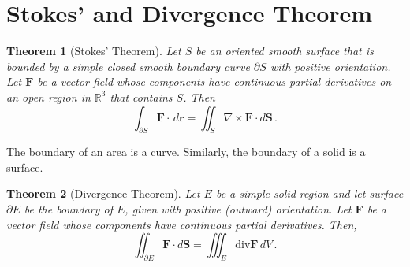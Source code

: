 \documentclass[
]{book}
\newtheorem{theorem}{Theorem}[chapter]
\theoremstyle{definition}
\theoremstyle{definition}
\theoremstyle{definition}
\theoremstyle{definition}
\theoremstyle{remark}
\begin{document}
\hypertarget{stokes-and-divergence-theorem}{%
\section{Stokes' and Divergence Theorem}\label{stokes-and-divergence-theorem}}

\begin{theorem}[Stokes' Theorem]
Let \(S\) be an oriented smooth surface that is bounded by a simple closed
smooth boundary curve \(\partial S\) with positive orientation.
Let \(\mathbf{F}\) be a vector field whose components have continuous partial
derivatives on an open region in \(\mathbb{R}^3\) that contains \(S\).
Then
\begin{equation*}
    \int_{\partial S} \mathbf{F} \cdot \, d\mathbf{r} = \iint_S \nabla \times \mathbf{F} \cdot d\mathbf{S} \,.
\end{equation*}
\end{theorem}

The boundary of an area is a curve.
Similarly, the boundary of a solid is a surface.

\begin{theorem}[Divergence Theorem]
Let \(E\) be a simple solid region and let surface \(\partial E\) be the boundary of \(E\),
given with positive (outward) orientation.
Let \(\mathbf{F}\) be a vector field whose components have continuous partial derivatives.
Then,
\begin{equation*}
    \iint_{\partial E} \mathbf{F} \cdot d\mathbf{S} = \iiint_E \mathrm{div} \mathbf{F} \, dV \,.
\end{equation*}
\end{theorem}
\end{document}
